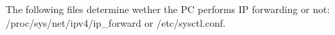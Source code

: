 The following files determine wether the PC performs IP forwarding or not: /proc/sys/net/ipv4/ip_forward or /etc/sysctl.conf.